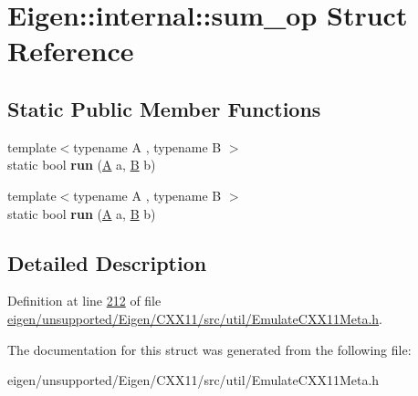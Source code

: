 \hypertarget{struct_eigen_1_1internal_1_1sum__op}{}\section{Eigen\+:\+:internal\+:\+:sum\+\_\+op Struct Reference}
\label{struct_eigen_1_1internal_1_1sum__op}
\subsection*{Static Public Member Functions}
\begin{DoxyCompactItemize}
\item 
\mbox{\label{struct_eigen_1_1internal_1_1sum__op_aabb5ec94a7a8538e8c5fc94bd26cbf74}} 
{\footnotesize template$<$typename A , typename B $>$ }\\static bool {\bfseries run} (\hyperlink{group___core___module_class_eigen_1_1_matrix}{A} a, \hyperlink{group___core___module_class_eigen_1_1_matrix}{B} b)
\item 
\mbox{\label{struct_eigen_1_1internal_1_1sum__op_aabb5ec94a7a8538e8c5fc94bd26cbf74}} 
{\footnotesize template$<$typename A , typename B $>$ }\\static bool {\bfseries run} (\hyperlink{group___core___module_class_eigen_1_1_matrix}{A} a, \hyperlink{group___core___module_class_eigen_1_1_matrix}{B} b)
\end{DoxyCompactItemize}


\subsection{Detailed Description}


Definition at line \hyperlink{eigen_2unsupported_2_eigen_2_c_x_x11_2src_2util_2_emulate_c_x_x11_meta_8h_source_l00212}{212} of file \hyperlink{eigen_2unsupported_2_eigen_2_c_x_x11_2src_2util_2_emulate_c_x_x11_meta_8h_source}{eigen/unsupported/\+Eigen/\+C\+X\+X11/src/util/\+Emulate\+C\+X\+X11\+Meta.\+h}.



The documentation for this struct was generated from the following file\+:\begin{DoxyCompactItemize}
\item 
eigen/unsupported/\+Eigen/\+C\+X\+X11/src/util/\+Emulate\+C\+X\+X11\+Meta.\+h\end{DoxyCompactItemize}

